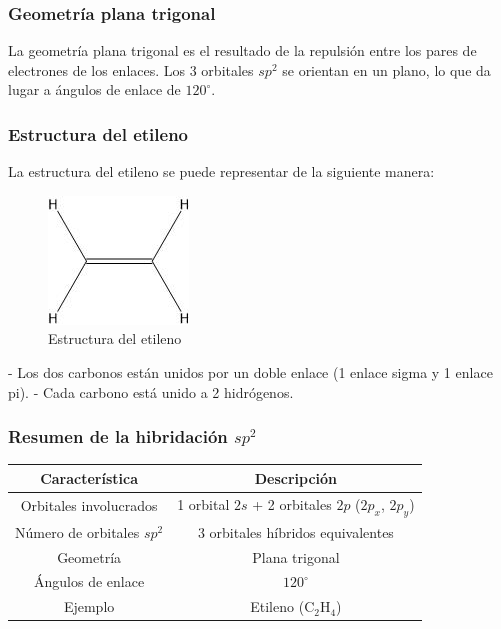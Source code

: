 \documentclass{article}
\begin{document}
\subsubsection{Geometría plana trigonal}
La geometría plana trigonal es el resultado de la repulsión entre los pares de electrones de los enlaces. Los 3 orbitales \( sp^2 \) se orientan en un plano, lo que da lugar a ángulos de enlace de \( 120^\circ \).

\subsubsection{Estructura del etileno}
La estructura del etileno se puede representar de la siguiente manera:

\begin{figure}[h]
    \centering
    \includegraphics[width=0.5\linewidth]{media/etileno.jpg}
    \caption{Estructura del etileno}
    \label{fig:etileno}
\end{figure}

- Los dos carbonos están unidos por un doble enlace (1 enlace sigma y 1 enlace pi).
- Cada carbono está unido a 2 hidrógenos.

\subsubsection{Resumen de la hibridación \( sp^2 \)}
\begin{table}[h!]
\centering
\begin{tabular}{|c|c|}
\hline
\textbf{Característica} & \textbf{Descripción} \\
\hline
Orbitales involucrados & 1 orbital \( 2s \) + 2 orbitales \( 2p \) (\( 2p_x \), \( 2p_y \)) \\
\hline
Número de orbitales \( sp^2 \) & 3 orbitales híbridos equivalentes \\
\hline
Geometría & Plana trigonal \\
\hline
Ángulos de enlace & \( 120^\circ \) \\
\hline
Ejemplo & Etileno (\( \text{C}_2\text{H}_4 \)) \\
\hline
\end{tabular}
\end{table}
\end{document}
